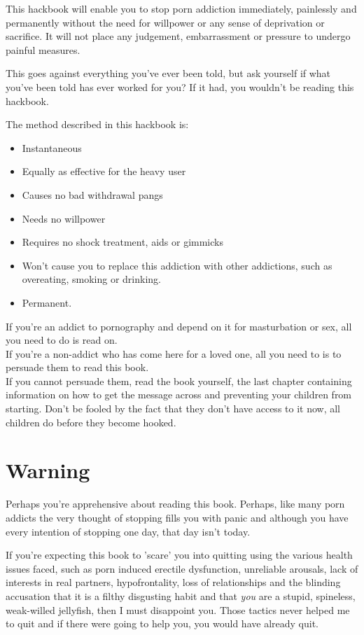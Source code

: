 \documentclass[easypeasy.tex]{subfiles}
\begin{document}
This hackbook will enable you to stop porn addiction immediately, painlessly and permanently without the need for willpower or any sense of deprivation or sacrifice. It will not place any judgement, embarrassment or pressure to undergo painful measures.

This goes against everything you've ever been told, but ask yourself if what you've been told has ever worked for you? If it had, you wouldn't be reading this hackbook.

The method described in this hackbook is:
\begin{itemize}
\item Instantaneous
\item Equally as effective for the heavy user
\item Causes no bad withdrawal pangs
\item Needs no willpower
\item Requires no shock treatment, aids or gimmicks
\item Won't cause you to replace this addiction with other addictions, such as overeating, smoking or drinking.
\item Permanent.
\end{itemize}

If you're an addict to pornography and depend on it for masturbation or sex, all you need to do is read on.\\
If you're a non-addict who has come here for a loved one, all you need to is to persuade them to read this book.\\
If you cannot persuade them, read the book yourself, the last chapter containing information on how to get the message across and preventing your children from starting. Don't be fooled by the fact that they don't have access to it now, all children do before they become hooked.

\section{Warning}
Perhaps you're apprehensive about reading this book. Perhaps, like many porn addicts the very thought of stopping fills you with panic and although you have every intention of stopping one day, that day isn't today.

If you're expecting this book to 'scare' you into quitting using the various health issues faced, such as porn induced erectile dysfunction, unreliable arousals, lack of interests in real partners, hypofrontality, loss of relationships and the blinding accusation that it is a filthy disgusting habit and that \textit{you} are a stupid, spineless, weak-willed jellyfish, then I must disappoint you. Those tactics never helped me to quit and if there were going to help you, you would have already quit.
\end{document}
